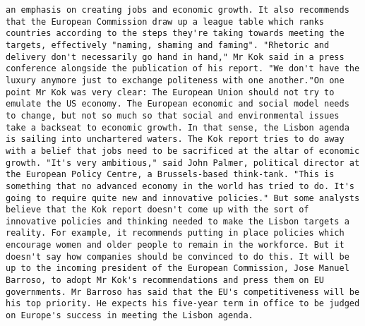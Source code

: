 \documentclass[11pt]{article}
\begin{document}
\begin{Verbatim}[commandchars=\\\{\}]
an emphasis on creating jobs and economic growth. It also recommends that the European Commission draw up a league table which ranks countries according to the steps they're taking towards meeting the targets, effectively "naming, shaming and faming". "Rhetoric and delivery don't necessarily go hand in hand," Mr Kok said in a press conference alongside the publication of his report. "We don't have the luxury anymore just to exchange politeness with one another."On one point Mr Kok was very clear: The European Union should not try to emulate the US economy. The European economic and social model needs to change, but not so much so that social and environmental issues take a backseat to economic growth. In that sense, the Lisbon agenda is sailing into unchartered waters. The Kok report tries to do away with a belief that jobs need to be sacrificed at the altar of economic growth. "It's very ambitious," said John Palmer, political director at the European Policy Centre, a Brussels-based think-tank. "This is something that no advanced economy in the world has tried to do. It's going to require quite new and innovative policies." But some analysts believe that the Kok report doesn't come up with the sort of innovative policies and thinking needed to make the Lisbon targets a reality. For example, it recommends putting in place policies which encourage women and older people to remain in the workforce. But it doesn't say how companies should be convinced to do this. It will be up to the incoming president of the European Commission, Jose Manuel Barroso, to adopt Mr Kok's recommendations and press them on EU governments. Mr Barroso has said that the EU's competitiveness will be his top priority. He expects his five-year term in office to be judged on Europe's success in meeting the Lisbon agenda.  

\end{Verbatim}
\end{document}
